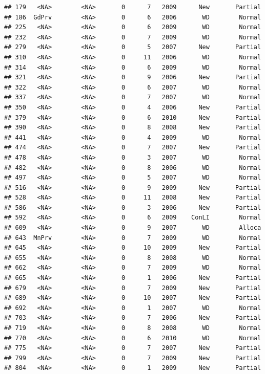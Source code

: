 \documentclass[]{article}
\begin{document}
\begin{verbatim}
## 179   <NA>        <NA>       0      7   2009      New       Partial
## 186  GdPrv        <NA>       0      6   2006       WD        Normal
## 225   <NA>        <NA>       0      6   2009       WD        Normal
## 232   <NA>        <NA>       0      7   2009       WD        Normal
## 279   <NA>        <NA>       0      5   2007      New       Partial
## 310   <NA>        <NA>       0     11   2006       WD        Normal
## 314   <NA>        <NA>       0      6   2009       WD        Normal
## 321   <NA>        <NA>       0      9   2006      New       Partial
## 322   <NA>        <NA>       0      6   2007       WD        Normal
## 337   <NA>        <NA>       0      7   2007       WD        Normal
## 350   <NA>        <NA>       0      4   2006      New       Partial
## 379   <NA>        <NA>       0      6   2010      New       Partial
## 390   <NA>        <NA>       0      8   2008      New       Partial
## 441   <NA>        <NA>       0      4   2009       WD        Normal
## 474   <NA>        <NA>       0      7   2007      New       Partial
## 478   <NA>        <NA>       0      3   2007       WD        Normal
## 482   <NA>        <NA>       0      8   2006       WD        Normal
## 497   <NA>        <NA>       0      5   2007       WD        Normal
## 516   <NA>        <NA>       0      9   2009      New       Partial
## 528   <NA>        <NA>       0     11   2008      New       Partial
## 586   <NA>        <NA>       0      3   2006      New       Partial
## 592   <NA>        <NA>       0      6   2009    ConLI        Normal
## 609   <NA>        <NA>       0      9   2007       WD        Alloca
## 643  MnPrv        <NA>       0      7   2009       WD        Normal
## 645   <NA>        <NA>       0     10   2009      New       Partial
## 655   <NA>        <NA>       0      8   2008       WD        Normal
## 662   <NA>        <NA>       0      7   2009       WD        Normal
## 665   <NA>        <NA>       0      1   2006      New       Partial
## 679   <NA>        <NA>       0      7   2009      New       Partial
## 689   <NA>        <NA>       0     10   2007      New       Partial
## 692   <NA>        <NA>       0      1   2007       WD        Normal
## 703   <NA>        <NA>       0      7   2006      New       Partial
## 719   <NA>        <NA>       0      8   2008       WD        Normal
## 770   <NA>        <NA>       0      6   2010       WD        Normal
## 775   <NA>        <NA>       0      7   2007      New       Partial
## 799   <NA>        <NA>       0      7   2009      New       Partial
## 804   <NA>        <NA>       0      1   2009      New       Partial

\end{verbatim}
\end{document}
